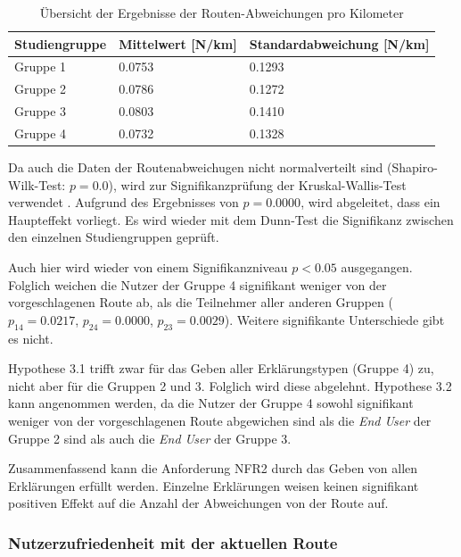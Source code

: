 \begin{table}[htb!]
    \centering
    \begin{tabular}{p{}p{}p{}}
        \hline
        Studiengruppe  & Mittelwert [N/km] & Standardabweichung [N/km]\\
        \toprule
        Gruppe 1                & 0.0753 & 0.1293 \\
        Gruppe 2                & 0.0786 & 0.1272 \\
        Gruppe 3                & 0.0803 & 0.1410 \\
        Gruppe 4                & 0.0732 & 0.1328 \\
        \bottomrule
    \end{tabular}
    \caption{Übersicht der Ergebnisse der Routen-Abweichungen pro Kilometer}
    \label{tab:study_offroute_results}
\end{table}

Da auch die Daten der Routenabweichugen nicht normalverteilt sind (Shapiro-Wilk-Test: $ p = 0.0 $), wird zur Signifikanzprüfung der Kruskal-Wallis-Test verwendet \cite{wohlin2012experimentation}. Aufgrund des Ergebnisses von $ p = 0.0000 $, wird abgeleitet, dass ein Haupteffekt vorliegt. Es wird wieder mit dem Dunn-Test die Signifikanz zwischen den einzelnen Studiengruppen geprüft. 

Auch hier wird wieder von einem Signifikanzniveau $ p < 0.05 $ ausgegangen. Folglich weichen die Nutzer der Gruppe 4 signifikant weniger von der vorgeschlagenen Route ab, als die Teilnehmer aller anderen Gruppen ($ p_{14} = 0.0217 $, $ p_{24} = 0.0000 $, $ p_{23} = 0.0029 $). Weitere signifikante Unterschiede gibt es nicht.

Hypothese 3.1 trifft zwar für das Geben aller Erklärungstypen (Gruppe 4) zu, nicht aber für die Gruppen 2 und 3. Folglich wird diese abgelehnt. Hypothese 3.2 kann angenommen werden, da die Nutzer der Gruppe 4 sowohl signifikant weniger von der vorgeschlagenen Route abgewichen sind als die \textit{End User} der Gruppe 2 sind als auch die \textit{End User} der Gruppe 3.

Zusammenfassend kann die Anforderung NFR2 durch das Geben von allen Erklärungen erfüllt werden. Einzelne Erklärungen weisen keinen signifikant positiven Effekt auf die Anzahl der Abweichungen von der Route auf. 

\subsubsection{Nutzerzufriedenheit mit der aktuellen Route}

